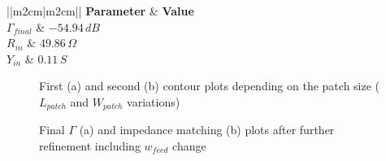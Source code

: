 \documentclass[10pt,a4paper,twocolumn]{article}
\begin{document}
{\begin{table}
	\begin{center}
		{\selectfont	\begin{tabular}{||m{2cm}|m{2cm}||}
				\hline
				\textbf{Parameter} & \textbf{Value}\\
				\hline
				$\Gamma_{final}$ & $-54.94\,dB$\\
				\hline
				$R_{in}$ & $49.86\,\Omega$ \\
				\hline
				$Y_{in}$ & $ 0.11\,S$ \\
				\hline
		\end{tabular}}
		\caption{Final $\Gamma$ and impedance matching values after $w_{feed}$ change}
		\label{table:Gamma and Z}
	\end{center}
\end{table}
\begin{figure}[bt!]
	\begin{subfigure}{0.48\linewidth}
		\def\svgwidth{\linewidth}
		\tiny{}
		\caption{}
		\label{fig:first contour}
	\end{subfigure}
	\hfill
	\begin{subfigure}{0.48\linewidth}
		\def\svgwidth{\linewidth}
		\tiny{}
		\caption{}
		\label{fig:second contour}
	\end{subfigure}
	\caption{First (a) and second (b) contour plots depending on the patch size ($L_{patch}$ and $W_{patch}$ variations)}
\end{figure}


\begin{figure}[bt!]
		\begin{subfigure}{0.45\linewidth}
				\def\svgwidth{\linewidth}
			\tiny{}
					\caption{}
		\end{subfigure}
	\hfill
		\begin{subfigure}{0.48\linewidth}
				\def\svgwidth{\linewidth}
			\tiny{}
					\caption{}
		\end{subfigure}
		\caption{Final $\Gamma$ (a) and impedance matching (b) plots after further refinement including $w_{feed}$ change}
		\label{fig:Gamma and Z}
\end{figure}

}
\end{document}
